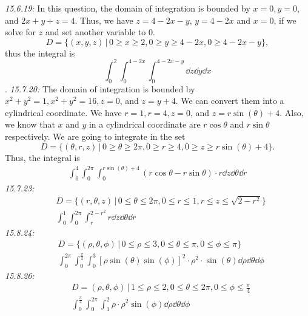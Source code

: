 \documentclass[8pt,twocolumn]{article}
\begin{document}
\begin{Answer}[number=19]
  \emph{15.6.19:}
  In this question, the domain of integration is bounded by $x=0, y=0$, and
  $2x+y+z=4$. Thus, we have $z=4-2x-y$, $y=4-2x$ and $x=0$, if we solve for $z$
  and set another variable to $0$.
  \[D = \{(x,y,z) \,\big\vert\, 0\ge x\ge 2, 0\ge y\ge 4-2x, 0\ge 4-2x-y\},\] thus the
  integral is
  \[\int_0^2\int_0^{4-2x}\int_0^{4-2x-y}\dd{z}\dd{y}\dd{x}\].
  \emph{15.7.20:}
  The domain of integration is bounded by $x^2+y^2=1, x^2+y^2=16, z=0$, and
  $z=y+4$. We can convert them into a cylindrical coordinate. We have $r=1,
  r=4, z=0$, and $z=r\sin(\theta)+4$. Also, we know that $x$ and $y$ in a
  cylindrical coordinate are $r\cos\theta$ and $r\sin\theta$ respectively. We
  are going to integrate in the set
  \[
    D = \{(\theta, r, z) \,\big\vert\, 0\ge\theta\ge2\pi, 0\ge r\ge4, 0\ge z\ge
    r\sin(\theta)+4\}.
  \]
  Thus, the integral is
  \begin{align*}
    \int_0^4\int_0^{2\pi}\int_0^{r\sin(\theta)+4} (r\cos\theta-
    r\sin\theta)\cdot r\dd{z}\dd{\theta}\dd{r}
  \end{align*}
  \emph{15.7.23:}
  \begin{align*}
    &D = \{(r,\theta,z) \,\big\vert\, 0\le \theta\le2\pi, 0\le r\le 1, r\le z\le
    \sqrt{2-r^2}\} \\
    &\int_0^1\int_0^{2\pi}\int_r^{2-r^2} r\dd{z}\dd{\theta}\dd{r}
  \end{align*}
  \emph{15.8.24:}
  \begin{align*}
    &D = \{(\rho, \theta, \phi) \,\big\vert\, 0\le \rho \le 3, 0\le \theta\le \pi,
    0\le\phi\le \pi \} \\
    &\int_0^{2\pi}\int_0^{\frac{\pi}{2}}\int_0^3
    \left[\rho\sin(\theta)\sin(\phi)\right]^2\cdot\rho^2\cdot\sin(\theta) \dd{\rho}\dd{\theta}\dd{\phi}
  \end{align*}
  \emph{15.8.26:}
  \begin{align*}
    &D = {(\rho, \theta, \phi)\,\big\vert\,1\le\rho\le2, 0\le\theta\le2\pi,
    0\le\phi\le\frac{\pi}{4}} \\
    &\int_0^{\frac{\pi}{4}}\int_0^{2\pi}\int_1^2 \rho \cdot \rho^2\sin(\phi) \dd{\rho}\dd{\theta}\dd{\phi}
  \end{align*}
\end{Answer}
\end{document}
